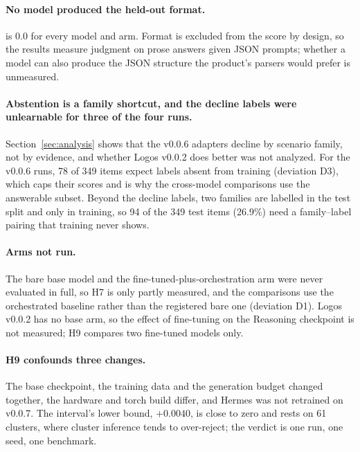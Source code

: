 \paragraph{No model produced the held-out format.}
 is 0.0 for every model and arm. Format is excluded from the score by design, so the results measure judgment on prose answers given JSON prompts; whether a model can also produce the JSON structure the product's parsers would prefer is unmeasured.

\paragraph{Abstention is a family shortcut, and the decline labels were unlearnable for three of the four runs.}
Section~\ref{sec:analysis} shows that the v0.0.6 adapters decline by scenario family, not by evidence, and whether Logos v0.0.2 does better was not analyzed. For the v0.0.6 runs, 78 of 349 items expect labels absent from training (deviation D3), which caps their scores and is why the cross-model comparisons use the answerable subset. Beyond the decline labels, two families are labelled  in the test split and only  in training, so 94 of the 349 test items (26.9\%) need a family--label pairing that training never shows.

\paragraph{Arms not run.}
The bare base model and the fine-tuned-plus-orchestration arm were never evaluated in full, so H7 is only partly measured, and the comparisons use the orchestrated baseline rather than the registered bare one (deviation D1). Logos v0.0.2 has no base arm, so the effect of fine-tuning on the Reasoning checkpoint is not measured; H9 compares two fine-tuned models only.

\paragraph{H9 confounds three changes.}
The base checkpoint, the training data and the generation budget changed together, the hardware and torch build differ, and Hermes was not retrained on v0.0.7. The interval's lower bound, $+0.0040$, is close to zero and rests on 61 clusters, where cluster inference tends to over-reject; the verdict is one run, one seed, one benchmark.

